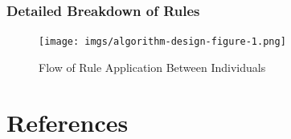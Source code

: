 \documentclass[12pt,letterpaper]{article}
\begin{document}
\subsubsection{Detailed Breakdown of Rules}

\begin{figure}
	\caption{Flow of Rule Application Between Individuals}
	\begin{center}
		\texttt{[image: imgs/algorithm-design-figure-1.png]}
	\end{center}
\end{figure}

\renewcommand\refname{\vskip -1cm}
\section{References}
\end{document}
